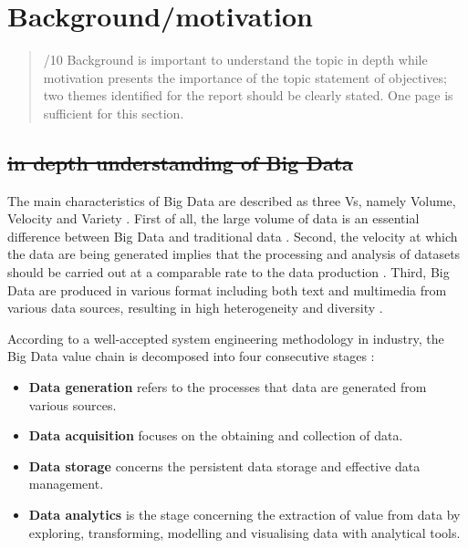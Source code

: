 \documentclass[conference]{IEEEtran}
\providecommand{\tightlist}{%
  \setlength{\itemsep}{0pt}\setlength{\parskip}{0pt}
}
\begin{document}
\hypertarget{backgroundmotivation}{%
\section{Background/motivation}\label{backgroundmotivation}}

\begin{quote}
/10 Background is important to understand the topic in depth while
motivation presents the importance of the topic statement of objectives;
two themes identified for the report should be clearly stated. One page
is sufficient for this section.
\end{quote}

\hypertarget{in-depth-understanding-of-big-data}{%
\subsection{\texorpdfstring{\sout{in depth understanding of Big
Data}}{in depth understanding of Big Data}}\label{in-depth-understanding-of-big-data}}

The main characteristics of Big Data are described as three Vs, namely
Volume, Velocity and Variety \autocite{OUSSOUS2018431,hu2014}. First of
all, the large volume of data is an essential difference between Big
Data and traditional data \autocite{hu2014}. Second, the velocity at
which the data are being generated implies that the processing and
analysis of datasets should be carried out at a comparable rate to the
data production \autocite{hu2014}. Third, Big Data are produced in
various format including both text and multimedia from various data
sources, resulting in high heterogeneity and diversity
\autocite{OUSSOUS2018431,Pouyanfar:2018}.

According to a well-accepted system engineering methodology in industry,
the Big Data value chain is decomposed into four consecutive stages
\autocite{hu2014}:

\begin{itemize}
\tightlist
\item
  \textbf{Data generation} refers to the processes that data are
  generated from various sources.
\item
  \textbf{Data acquisition} focuses on the obtaining and collection of
  data.
\item
  \textbf{Data storage} concerns the persistent data storage and
  effective data management.
\item
  \textbf{Data analytics} is the stage concerning the extraction of
  value from data by exploring, transforming, modelling and visualising
  data with analytical tools.
\end{itemize}
\end{document}
